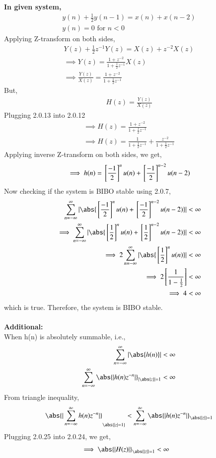 \documentclass[journal,12pt,twocolumn]{IEEEtran}
\begin{document}
\textbf{In given system,}\\
\begin{align}
    y(n)+\frac{1}{2}y(n-1) = x(n)+x(n-2) \\
    y(n)=0 \text{ for }n<0
\end{align}
Applying Z-transform on both sides,
\begin{align}
    Y(z) + \frac{1}{2}z^{-1}Y(z)=X(z) + z^{-2}X(z)\\
    \implies Y(z)=\frac{1+z^{-2}}{1+\frac{1}{2}z^{-1}}X(z)\\
    \implies \frac{Y(z)}{X(z)}=\frac{1+z^{-2}}{1+\frac{1}{2}z^{-1}}
\end{align}
But,
\begin{align}
    H(z) = \frac{Y(z)}{X(z)}
\end{align}
Plugging 2.0.13 into 2.0.12
\begin{align}
    \implies H(z) = \frac{1+z^{-2}}{1+\frac{1}{2}z^{-1}}\\
    \implies H(z) = \frac{1}{1+\frac{1}{2}z^{-1}} + \frac{z^{-2}}{1+\frac{1}{2}z^{-1}}
\end{align}
Applying inverse Z-transform on both sides, we get,
\begin{align}
\implies h(n)={}\left[\frac{-1}{2}\right]^nu(n) + {}\left[\frac{-1}{2}\right]^{n-2}u(n-2)
\end{align}
Now checking if the system is BIBO stable using 2.0.7,
\begin{align}
    \sum_{n=-\infty}^{\infty}|\abs{\sbrak{\frac{-1}{2}}^nu(n) + \sbrak{\frac{-1}{2}}^{n-2}u(n-2)}| < \infty \\
    \implies \sum_{n=-\infty}^{\infty}|\abs{\sbrak{\frac{1}{2}}^nu(n) + \sbrak{\frac{1}{2}}^{n-2}u(n-2)}| < \infty \\
    \implies 2\sum_{n=-\infty}^{\infty}|\abs{\sbrak{\frac{1}{2}}^nu(n)}| < \infty \\
    \implies 2\sbrak{\frac{1}{1-\frac{1}{2}}} < \infty \\
    \implies 4 < \infty
\end{align}
which is true. Therefore, the system is BIBO stable.\\ 
\\
\textbf{Additional:}\\
When h(n) is absolutely summable, i.e.,
\begin{align}
    \sum_{n=-\infty}^{\infty} |\abs{h(n)}|  &< \infty \\
    \sum_{n=-\infty}^{\infty}\abs{|h(n)z^{-n}|}_{|\abs{z}|=1}&<\infty \\
\end{align}
From triangle inequality,
\begin{align}
    \abs{|\sum_{n=-\infty}^{\infty}h(n)z^{-n}|}_\abs{|z|=1}<\sum_{n=-\infty}^{\infty}\abs{|h(n)z^{-n}|}_{\abs{|z|}=1}
\end{align}
Plugging 2.0.25 into 2.0.24, we get, 
\begin{align}
    \implies \abs{|H(z)|}_{\abs{|z|}=1}&<\infty 
\end{align}
\end{document}
